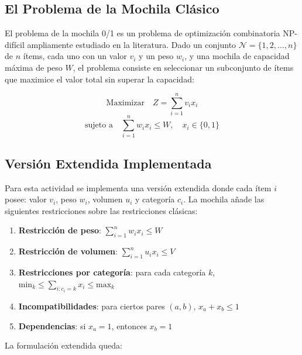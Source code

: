 \subsection{El Problema de la Mochila Clásico}

El problema de la mochila 0/1 es un problema de optimización combinatoria NP-difícil
ampliamente estudiado en la literatura. Dado un conjunto $\mathcal{N} = \{1, 2, \ldots, n\}$
de $n$ ítems, cada uno con un valor $v_i$ y un peso $w_i$, y una mochila de capacidad
máxima de peso $W$, el problema consiste en seleccionar un subconjunto de ítems que
maximice el valor total sin superar la capacidad:

\begin{equation}
  \text{Maximizar} \quad Z = \sum_{i=1}^{n} v_i x_i
  \label{eq:obj_clasico}
\end{equation}
\begin{equation}
  \text{sujeto a} \quad \sum_{i=1}^{n} w_i x_i \leq W, \quad x_i \in \{0,1\}
  \label{eq:cap_clasico}
\end{equation}

\subsection{Versión Extendida Implementada}

Para esta actividad se implementa una versión extendida donde cada ítem $i$ posee:
valor $v_i$, peso $w_i$, volumen $u_i$ y categoría $c_i$. La mochila añade las siguientes
restricciones sobre las restricciones clásicas:

\begin{enumerate}[label=\textbf{R\arabic*.}]
  \item \textbf{Restricción de peso}: $\displaystyle\sum_{i=1}^{n} w_i x_i \leq W$
  \item \textbf{Restricción de volumen}: $\displaystyle\sum_{i=1}^{n} u_i x_i \leq V$
  \item \textbf{Restricciones por categoría}: para cada categoría $k$,
        $\text{min}_k \leq \displaystyle\sum_{i : c_i = k} x_i \leq \text{max}_k$
  \item \textbf{Incompatibilidades}: para ciertos pares $(a,b)$, $x_a + x_b \leq 1$
  \item \textbf{Dependencias}: si $x_a = 1$, entonces $x_b = 1$
\end{enumerate}

La formulación extendida queda:

